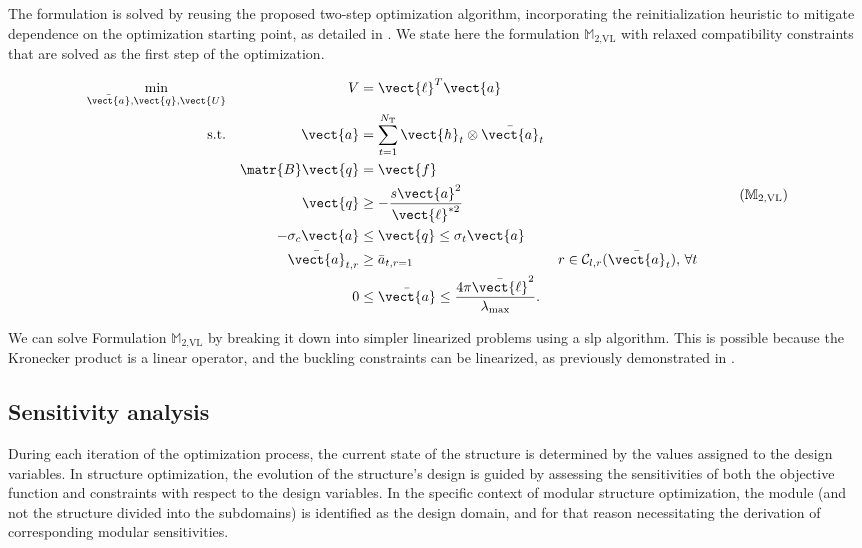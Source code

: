 The formulation is solved by reusing the proposed two-step optimization algorithm, incorporating the reinitialization heuristic to mitigate dependence on the optimization starting point, as detailed in . We state here the formulation $\mathbb{M}_\text{2,VL}$ with relaxed compatibility constraints that are solved as the first step of the optimization. 

\begin{equation}
    \begin{aligned}
    \min_{\bar{\vect{a}}, \vect{q}, \vect{U}}   && V &= \vect{\ell}^{T}\vect{a}\\
    \textrm{s.t.}  && \vect{a} &= \sum_{t=1}^{N_\text{T}} \vect{h}_t\otimes\bar{\vect{a}}_t \\ 
    && \matr{B}\vect{q} &= \vect{f} && \\
    && \vect{q} &\geq -\frac{s\vect{a}^2}{\vect{\ell}^{*2}} &&  \\
    && -\sigma_c\vect{a} &\leq \vect{q} \leq \sigma_t\vect{a} &&  \\
    && \bar{\vect{a}}_{t,r}&\geq \bar{a}_{t,r=1} && r \in \mathcal{C}_{l,r}(\bar{\vect{a}}_t),\, \forall t \\
    && 0 &\leq \bar{\vect{a}} \leq \frac{4 \pi \bar{\vect{\ell}}^2}{\lambda_{\text{max}}}. \\
    \end{aligned}
    \tag{${\mathbb{M}}_\text{2,VL}$}
    \label{eq:05_optim_no_constr_modular}
\end{equation}

We can solve Formulation $\mathbb{M}_\text{2,VL}$ by breaking it down into simpler linearized problems using a \gls{slp} algorithm. This is possible because the Kronecker product is a linear operator, and the buckling constraints can be linearized, as previously demonstrated in .

\subsection{Sensitivity analysis}
During each iteration of the optimization process, the current state of the structure is determined by the values assigned to the design variables. In structure optimization, the evolution of the structure's design is guided by assessing the sensitivities of both the objective function and constraints with respect to the design variables. In the specific context of modular structure optimization, the module (and not the structure divided into the subdomains) is identified as the design domain, and for that reason necessitating the derivation of corresponding modular sensitivities.

